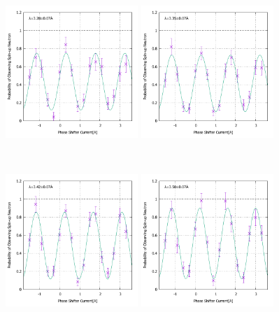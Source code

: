 \begin{figure}[h]
\begin{minipage}{0.33\hsize}
\end{minipage}
\begin{minipage}{0.33\hsize}
\includegraphics[width=5cm]{discussion/IF_rb/Interference_rb_fit460.pdf}
\end{minipage}
\begin{minipage}{0.33\hsize}
\includegraphics[width=5cm]{discussion/IF_rb/Interference_rb_fit470.pdf}
\end{minipage}\\
\begin{minipage}{0.33\hsize}
\includegraphics[width=5cm]{discussion/IF_rb/Interference_rb_fit480.pdf}
\end{minipage}
\begin{minipage}{0.33\hsize}
\includegraphics[width=5cm]{discussion/IF_rb/Interference_rb_fit490.pdf}

\end{minipage}
\end{figure}
